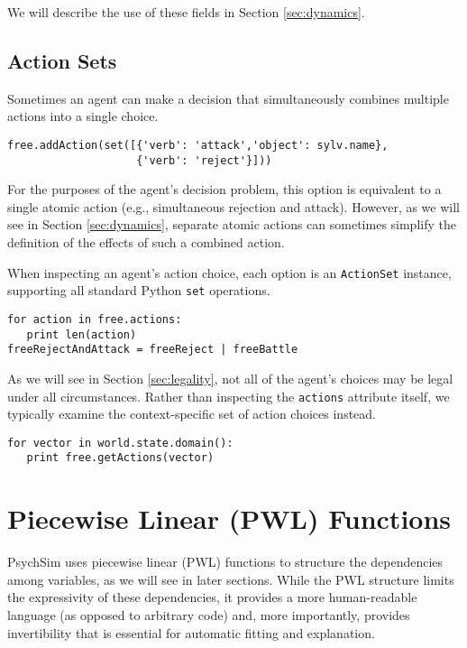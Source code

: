 \documentclass{article}
\begin{document}
We will describe the use of these fields in Section \ref{sec:dynamics}.

\subsection{Action Sets}

Sometimes an agent can make a decision that simultaneously combines multiple actions into a single choice.

\begin{verbatim}
free.addAction(set([{'verb': 'attack','object': sylv.name},
                    {'verb': 'reject'}]))
\end{verbatim}

For the purposes of the agent's decision problem, this option is equivalent to a single atomic action (e.g., simultaneous rejection and attack). However, as we will see in Section \ref{sec:dynamics}, separate atomic actions can sometimes simplify the definition of the effects of such a combined action.

When inspecting an agent's action choice, each option is an {\tt ActionSet} instance, supporting all standard Python {\tt set} operations.

\begin{verbatim}
for action in free.actions:
   print len(action)
freeRejectAndAttack = freeReject | freeBattle
\end{verbatim}

As we will see in Section \ref{sec:legality}, not all of the agent's choices may be legal under all circumstances. Rather than inspecting the {\tt actions} attribute itself, we typically examine the context-specific set of action choices instead.

\begin{verbatim}
for vector in world.state.domain():
   print free.getActions(vector)
\end{verbatim}

\section{Piecewise Linear (PWL) Functions}

PsychSim uses piecewise linear (PWL) functions to structure the dependencies among variables, as we will see in later sections. While the PWL structure limits the expressivity of these dependencies, it provides a more human-readable language (as opposed to arbitrary code) and, more importantly, provides invertibility that is essential for automatic fitting and explanation.
\end{document}
